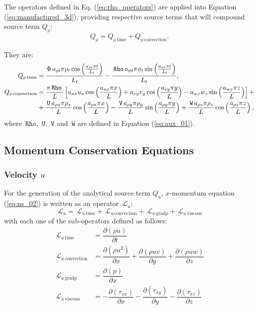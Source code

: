 \documentclass[10pt]{article}
\newcommand{\Diff}[2] {\dfrac{\partial( #1)}{\partial #2}}
\newcommand{\Rho}{\,\mathtt{Rho}}
\newcommand{\U}{\,\mathtt{U}}
\newcommand{\V}{\,\mathtt{V}}
\newcommand{\W}{\,\mathtt{W}}
\newcommand{\Lo}{\,\mathcal{L}}
\newcommand{\convection}{\text{convection}}
\newcommand{\gradp}{\text{grad}p}
\newcommand{\viscous}{\text{viscous}}
\begin{document}
The operators defined in Eq. (\ref{eq:rho_operators}) are applied into Equation  (\ref{eq:manufactured_3d}), providing respective source terms that will compound source term $Q_{\rho}$:
\begin{equation*}
 Q_{\rho} = Q_{\rho \, \text{time}}+Q_{\rho \, \text{convection}}.
\end{equation*}


They are:
\begin{equation*}
 \begin{split}
 Q_{\rho \, \text{time}}&= 
\frac{ \Phi \,  a_{\rho t} \pi\rho_{t} \cos\left(\frac{a_{\rho t} \pi t}{L_t}\right)}{L_t} - \frac{ \Rho \, a_{\phi t} \pi\phi_{t} \sin\left(\frac{a_{\phi t} \pi t}{L_t}\right)}{L_t}, \\\vspace{20pt}
%
 Q_{\rho \, \text{convection}}&= 
\frac{\pi \Rho \, }{L} \left[a_{ux} u_{x} \cos\left(\frac{a_{ux} \pi x}{L}\right) + a_{vy} v_{y} \cos\left(\frac{a_{vy} \pi y}{L}\right) - a_{wz} w_{z} \sin\left(\frac{a_{wz} \pi z}{L}\right)\right] + \\ 
&+ \frac{ \U \, a_{\rho x} \pi\rho_{x} }{L}\cos\left(\frac{a_{\rho x} \pi x}{L}\right)  - \frac{ \V \, a_{\rho y} \pi\rho_{y} }{L}\sin\left(\frac{a_{\rho y} \pi y}{L}\right)+ \frac{ \W \, a_{\rho z} \pi\rho_{z} }{L}\cos\left(\frac{a_{\rho z} \pi z}{L}\right),
 \end{split}
\end{equation*}
where $\Rho,\,\U,\,\V$ and $\W$  are defined in Equation (\ref{eq:aux_01}).


\subsection{Momentum Conservation Equations}

\subsubsection{Velocity $u$}
For the generation of the analytical source term $Q_u$, $x$-momentum equation (\ref{eq:ns_02}) is written as an operator $\Lo_u$:
 $$\Lo_u = \Lo_{u \, \text{time}}+\Lo_{u \, \convection}+\Lo_{u \, \gradp }+\Lo_{u \, \viscous }$$
with each one of the sub-operators defined as follows:
\begin{equation*}
 \begin{split}
\Lo_{u \, \text{time}}&= \Diff{\rho u}{t} \\
\Lo_{u \, \convection}&= \Diff{\rho u^2 }{x}+\Diff{\rho uv}{y} +\Diff{\rho uw}{z}\\
\Lo_{u \, \gradp }&= \Diff{p}{x}\\
\Lo_{u \, \viscous }&= -\Diff{\tau_{xx}}{x}-\Diff{\tau_{xy}}{y}-\Diff{\tau_{xz}}{z}
 \end{split}
\end{equation*}
\end{document}
